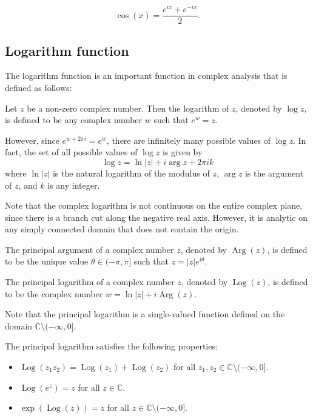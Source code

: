 \documentclass[12pt,openany]{book}
\theoremstyle{definition}
\begin{document}
	\begin{equation*}
	\cos(x) = \frac{e^{ix} + e^{-ix}}{2}.
	\end{equation*}
	
	\newpage
	\subsection{Logarithm function}
	
	The logarithm function is an important function in complex analysis that is defined as follows:
	
	Let $z$ be a non-zero complex number. Then the logarithm of $z$, denoted by $\log z$, is defined to be any complex number $w$ such that $e^w = z$.
	
	However, since $e^{w+2\pi i} = e^w$, there are infinitely many possible values of $\log z$. In fact, the set of all possible values of $\log z$ is given by
	\[ \log z = \ln|z| + i\arg z + 2\pi ik \]
	where $\ln|z|$ is the natural logarithm of the modulus of $z$, $\arg z$ is the argument of $z$, and $k$ is any integer.
	
	Note that the complex logarithm is not continuous on the entire complex plane, since there is a branch cut along the negative real axis. However, it is analytic on any simply connected domain that does not contain the origin.
	
	The principal argument of a complex number $z$, denoted by $\operatorname{Arg}(z)$, is defined to be the unique value $\theta \in (-\pi, \pi]$ such that $z = |z| e^{i\theta}$.
	
	The principal logarithm of a complex number $z$, denoted by $\operatorname{Log}(z)$, is defined to be the complex number $w = \ln |z| + i \operatorname{Arg}(z)$.
	
	Note that the principal logarithm is a single-valued function defined on the domain $\mathbb{C} \setminus (-\infty,0]$.
	
	The principal logarithm satisfies the following properties:
	
	\begin{itemize}
		\item $\operatorname{Log}(z_1 z_2) = \operatorname{Log}(z_1) + \operatorname{Log}(z_2)$ for all $z_1, z_2 \in \mathbb{C} \setminus (-\infty,0]$.
		\item $\operatorname{Log}(e^z) = z$ for all $z \in \mathbb{C}$.
		\item $\exp(\operatorname{Log}(z)) = z$ for all $z \in \mathbb{C} \setminus (-\infty,0]$.
	\end{itemize}
	
\end{document}
